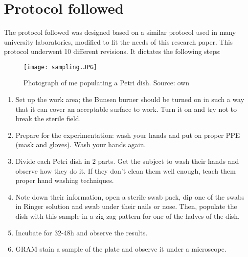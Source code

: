 \section{Protocol followed}
\paragraph{}The protocol followed was designed based on a similar protocol used in many university laboratories\cite{olearyPracticalHandbookMicrobiology1989}, modified to fit the needs of this research paper. This protocol underwent 10 different revisions. It dictates the following steps: \newline\begin{wrapfigure}{r}{0.4\textwidth}\begin{center}\texttt{[image: sampling.JPG]}\end{center}\caption{Photograph of me populating a Petri dish. Source: own  }\end{wrapfigure}
\begin{enumerate}[label=\arabic*)]
\item Set up the work area; the Bunsen burner should be turned on in such a way that it can cover an acceptable surface to work. Turn it on and try not to break the sterile field.
\item Prepare for the experimentation: wash your hands and put on proper PPE (mask and gloves). Wash your hands again.
\item Divide each Petri dish in 2 parts. Get the subject to wash their hands and observe how they do it. If they don't clean them well enough, teach them proper hand washing techniques.
\item Note down their information, open a sterile swab pack, dip one of the swabs in Ringer solution and swab under their nails or nose. Then, populate the dish with this sample in a zig-zag pattern for one of the halves of the dish.
\item Incubate for 32-48h and observe the results.
\item GRAM stain a sample of the plate and observe it under a microscope.
\end{enumerate}
\newpage